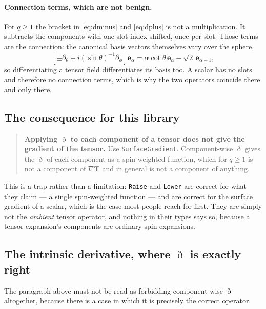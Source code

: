 \documentclass[11pt,a4paper]{article}
\newcommand{\ebasis}[1]{\mathbf{e}_{#1}}
\newcommand{\code}[1]{\texttt{#1}}
\begin{document}
\paragraph{Connection terms, which are not benign.}  For $q\geq 1$ the
bracket in \eqref{eq:dminus} and \eqref{eq:dplus} is not a multiplication.
It subtracts the components with one slot index shifted, once per slot.
Those terms are the connection: the canonical basis vectors themselves
vary over the sphere,
\begin{equation}
  \left[\pm\partial_\theta + i(\sin\theta)^{-1}\partial_\phi\right]
    \ebasis{\alpha}
    = \alpha\cot\theta\,\ebasis{\alpha} - \sqrt{2}\,\ebasis{\alpha\pm1},
  \label{eq:basisderiv}
\end{equation}
so differentiating a tensor field differentiates its basis too.  A scalar
has no slots and therefore no connection terms, which is why the two
operators coincide there and only there.

\subsection{The consequence for this library}

\begin{quote}
  \textbf{Applying $\eth$ to each component of a tensor does not give the
  gradient of the tensor.}  Use \code{SurfaceGradient}.  Component-wise
  $\eth$ gives the $\eth$ of each component as a spin-weighted function,
  which for $q\geq 1$ is not a component of $\nabla\mathbf{T}$ and in
  general is not a component of anything.
\end{quote}

This is a trap rather than a limitation: \code{Raise} and \code{Lower} are
correct for what they claim --- a single spin-weighted function --- and are
correct for the surface gradient of a scalar, which is the case most people
reach for first.  They are simply not the \emph{ambient} tensor operator, and
nothing in their types says so, because a tensor expansion's components are
ordinary spin expansions.

\subsection{The intrinsic derivative, where \texorpdfstring{$\eth$}{eth} is
exactly right}
\label{sec:intrinsic}

The paragraph above must not be read as forbidding component-wise $\eth$
altogether, because there is a case in which it is precisely the correct
operator.
\end{document}
